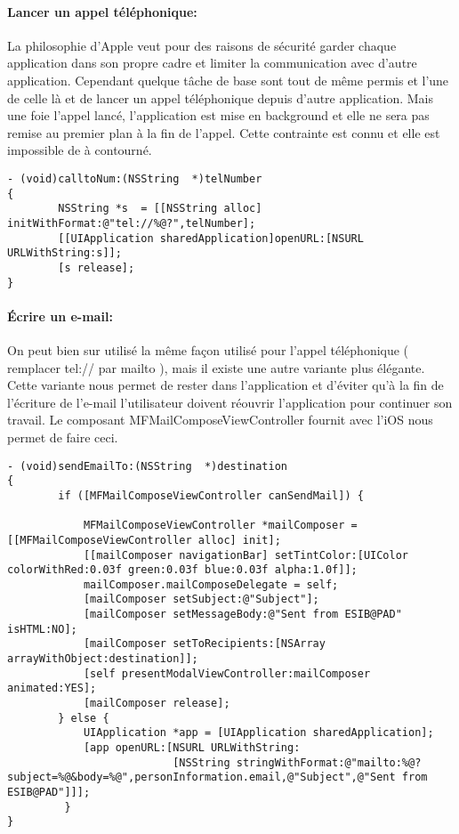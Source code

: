 					\paragraph{Lancer un appel téléphonique:} La philosophie d'Apple veut pour des raisons de sécurité garder chaque application dans son propre cadre et limiter la communication avec d'autre application. Cependant quelque tâche de base sont tout de même permis et l'une de celle là et de lancer un appel téléphonique depuis d'autre application. Mais une foie l'appel lancé, l'application est mise en background et elle ne sera pas remise au premier plan à la fin de l'appel. Cette contrainte est connu et elle est impossible de à contourné.
			\lstset{
				style = Xcode,
				caption=Lancement d'un appel téléphonique sur l'iPhone.,
				breaklines=true,
				frame=single
				}
					
\begin{lstlisting}[name=Recherche dans UITableView  , label=searchTBV]
- (void)calltoNum:(NSString  *)telNumber
{
        NSString *s  = [[NSString alloc] initWithFormat:@"tel://%@?",telNumber];
        [[UIApplication sharedApplication]openURL:[NSURL URLWithString:s]];   
        [s release];
}
\end{lstlisting}
					
			\paragraph{Écrire un e-mail:} On peut bien sur utilisé la même façon utilisé pour l'appel téléphonique ( remplacer tel:// par mailto ), mais il existe une autre variante plus élégante. Cette variante nous permet de rester dans l'application et d'éviter qu'à la fin de l'écriture de l'e-mail l'utilisateur doivent réouvrir l'application pour continuer son travail.  Le composant MFMailComposeViewController fournit avec l'iOS nous permet de faire ceci.
\lstset{
		style = Xcode,
		caption=Ouverture  de la fenêtre d'écriture d'e-mail,
		breaklines=true,
		frame=single
}
				
\begin{lstlisting}[name=Recherche dans UITableView  , label=searchTBV]
- (void)sendEmailTo:(NSString  *)destination
{
		if ([MFMailComposeViewController canSendMail]) {
            
            MFMailComposeViewController *mailComposer = [[MFMailComposeViewController alloc] init];
            [[mailComposer navigationBar] setTintColor:[UIColor colorWithRed:0.03f green:0.03f blue:0.03f alpha:1.0f]];
            mailComposer.mailComposeDelegate = self;
            [mailComposer setSubject:@"Subject"];
            [mailComposer setMessageBody:@"Sent from ESIB@PAD" isHTML:NO];
            [mailComposer setToRecipients:[NSArray arrayWithObject:destination]];
            [self presentModalViewController:mailComposer animated:YES];
            [mailComposer release];
        } else {
            UIApplication *app = [UIApplication sharedApplication];
            [app openURL:[NSURL URLWithString:
                          [NSString stringWithFormat:@"mailto:%@?subject=%@&body=%@",personInformation.email,@"Subject",@"Sent from ESIB@PAD"]]];
         }
}
\end{lstlisting}


